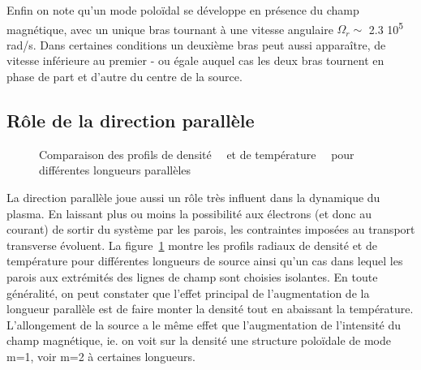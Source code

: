 \begin{refsection}
Enfin on note qu'un mode poloïdal se développe en
présence du champ magnétique, avec un unique bras tournant à une
vitesse angulaire $\Omega_r\sim$ 2.3 10\textsuperscript{5} rad/s. Dans
certaines conditions un deuxième bras peut aussi apparaître, de vitesse
inférieure au premier - ou égale auquel cas les deux bras tournent en phase de
part et d'autre du centre de la source.

\subsection{Rôle de la direction parallèle}

\begin{figure}[!htbp]
  \centering
    \caption{Comparaison des profils de
    densité~~ et de
    température~~ pour différentes
    longueurs parallèles}
    \label{4-CybeleProfileDenRadiale}
\end{figure}

La direction parallèle joue aussi un rôle très influent dans la
dynamique du plasma. En laissant plus ou moins la possibilité aux électrons (et
donc au courant) de sortir du système par les parois, les contraintes imposées
au transport transverse évoluent. La figure~\ref{4-CybeleProfileDenRadiale}
montre les profils radiaux de densité et de température pour différentes
longueurs de source ainsi qu'un cas dans lequel les parois aux extrémités des lignes de champ
sont choisies isolantes. En toute généralité, on peut constater que l'effet
principal de l'augmentation de la longueur parallèle est de faire monter la
densité tout en abaissant la température.
L'allongement de la source a le même effet que l'augmentation de l'intensité du
champ magnétique, ie. on voit sur la densité une structure poloïdale de mode
m=1, voir m=2 à certaines longueurs.


\end{refsection}
